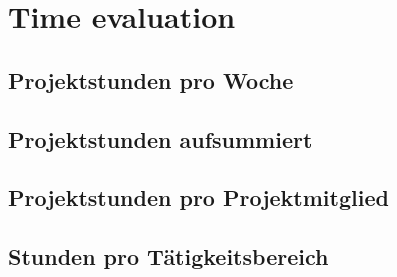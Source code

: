 \section*{Time evaluation}

\subsection{Projektstunden pro Woche}

\subsection{Projektstunden aufsummiert}

\subsection{Projektstunden pro Projektmitglied}

\subsection{Stunden pro Tätigkeitsbereich}
